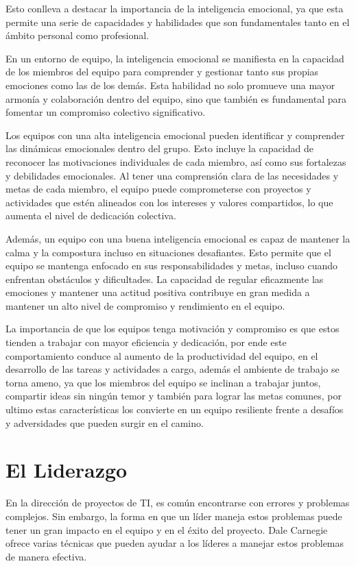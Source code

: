 \documentclass[journal]{IEEEtran}
\begin{document}
Esto conlleva a destacar la importancia de la inteligencia emocional, ya que esta permite una serie de capacidades y habilidades que son fundamentales tanto en el ámbito personal como profesional.

En un entorno de equipo, la inteligencia emocional se manifiesta en la capacidad de los miembros del equipo para comprender y gestionar tanto sus propias emociones como las de los demás. Esta habilidad no solo promueve una mayor armonía y colaboración dentro del equipo, sino que también es fundamental para fomentar un compromiso colectivo significativo.

Los equipos con una alta inteligencia emocional pueden identificar y comprender las dinámicas emocionales dentro del grupo. Esto incluye la capacidad de reconocer las motivaciones individuales de cada miembro, así como sus fortalezas y debilidades emocionales. Al tener una comprensión clara de las necesidades y metas de cada miembro, el equipo puede comprometerse con proyectos y actividades que estén alineados con los intereses y valores compartidos, lo que aumenta el nivel de dedicación colectiva.

Además, un equipo con una buena inteligencia emocional es capaz de mantener la calma y la compostura incluso en situaciones desafiantes. Esto permite que el equipo se mantenga enfocado en sus responsabilidades y metas, incluso cuando enfrentan obstáculos y dificultades. La capacidad de regular eficazmente las emociones y mantener una actitud positiva contribuye en gran medida a mantener un alto nivel de compromiso y rendimiento en el equipo.

La importancia de que los equipos tenga motivación y compromiso es que estos tienden a trabajar con mayor eficiencia y dedicación, por ende este comportamiento conduce al aumento de la productividad del equipo, en el desarrollo de las tareas y actividades a cargo, además el ambiente de trabajo se torna ameno, ya que los miembros del equipo se inclinan a trabajar juntos, compartir ideas sin ningún temor y también para lograr las metas comunes, por ultimo estas características los convierte en un equipo resiliente frente a desafíos y adversidades que pueden surgir en el camino.


\section{El Liderazgo}
En la dirección de proyectos de TI, es común encontrarse con errores y problemas complejos. Sin embargo, la forma en que un líder maneja estos problemas puede tener un gran impacto en el equipo y en el éxito del proyecto. Dale Carnegie ofrece varias técnicas que pueden ayudar a los líderes a manejar estos problemas de manera efectiva.
\end{document}
